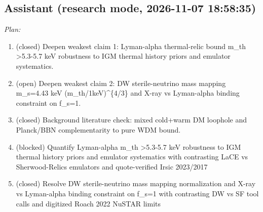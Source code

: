 \documentclass[11pt,a4paper]{article}
\begin{document}
\subsection*{Assistant \small(research mode, 2026-11-07 18:58:35)}
\textit{Plan:}\begin{enumerate}
  \item (closed) Deepen weakest claim 1: Lyman-alpha thermal-relic bound m\_th \textgreater{}5.3-5.7 keV robustness to IGM thermal history priors and emulator systematics.
  \item (open) Deepen weakest claim 2: DW sterile-neutrino mass mapping m\_s=4.43 keV (m\_th/1keV)\textasciicircum{}\{4/3\} and X-ray vs Lyman-alpha binding constraint on f\_s=1.
  \item (closed) Background literature check: mixed cold+warm DM loophole and Planck/BBN complementarity to pure WDM bound.
  \item (blocked) Quantify Lyman-alpha m\_th \textgreater{}5.3-5.7 keV robustness to IGM thermal history priors and emulator systematics with contrasting LaCE vs Sherwood-Relics emulators and quote-verified Irsic 2023/2017
  \item (closed) Resolve DW sterile-neutrino mass mapping normalization and X-ray vs Lyman-alpha binding constraint on f\_s=1 with contrasting DW vs SF tool calls and digitized Roach 2022 NuSTAR limits
\end{enumerate}
\end{document}
